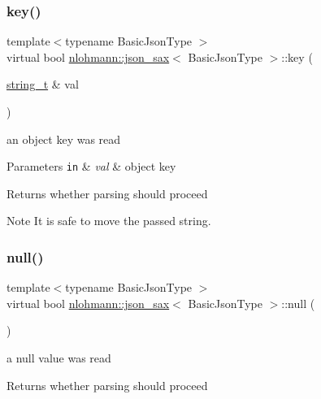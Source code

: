 \subsubsection{\texorpdfstring{key()}{key()}}
{\footnotesize\ttfamily template$<$typename Basic\+Json\+Type $>$ \\
virtual bool \hyperlink{structnlohmann_1_1json__sax}{nlohmann\+::json\+\_\+sax}$<$ Basic\+Json\+Type $>$\+::key (\begin{DoxyParamCaption}\item[{\hyperlink{structnlohmann_1_1json__sax_ae01977a9f3c5b3667b7a2929ed91061e}{string\+\_\+t} \&}]{val }\end{DoxyParamCaption})\hspace{0.3cm}{\ttfamily [pure virtual]}}



an object key was read 


\begin{DoxyParams}[1]{Parameters}
\mbox{\tt in}  & {\em val} & object key \\
\hline
\end{DoxyParams}
\begin{DoxyReturn}{Returns}
whether parsing should proceed 
\end{DoxyReturn}
\begin{DoxyNote}{Note}
It is safe to move the passed string. 
\end{DoxyNote}
\mbox{\label{structnlohmann_1_1json__sax_a0ad26edef3f8d530dcec3192bba82df6}} 
\subsubsection{\texorpdfstring{null()}{null()}}
{\footnotesize\ttfamily template$<$typename Basic\+Json\+Type $>$ \\
virtual bool \hyperlink{structnlohmann_1_1json__sax}{nlohmann\+::json\+\_\+sax}$<$ Basic\+Json\+Type $>$\+::null (\begin{DoxyParamCaption}{ }\end{DoxyParamCaption})\hspace{0.3cm}{\ttfamily [pure virtual]}}



a null value was read 

\begin{DoxyReturn}{Returns}
whether parsing should proceed 
\end{DoxyReturn}
\mbox{\label{structnlohmann_1_1json__sax_ae7c31614e8a82164d2d7f8dbf4671b25}} 
